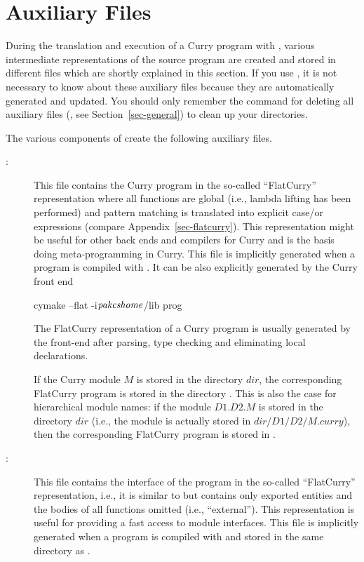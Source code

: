 \section{Auxiliary Files}
\label{sec-auxfiles}

During the translation and execution of a Curry program with \CYS,
various intermediate representations of the source program are created
and stored in different files which are shortly explained in this section.
If you use \CYS, it is not necessary to know about
these auxiliary files because they are automatically generated
and updated. You should only remember the command for deleting
all auxiliary files (, see Section~\ref{sec-general})
to clean up your directories.

The various components of \CYS create the following auxiliary files.
\begin{description}
\item[:] This file contains the Curry program
in the so-called ``FlatCurry'' representation where all functions are global
(i.e., lambda lifting has been performed) and pattern matching
is translated into explicit case/or expressions
(compare Appendix~\ref{sec-flatcurry}).
This representation might be useful for other back ends and
compilers for Curry and is the basis doing meta-programming in Curry.
This file is implicitly
generated when a program is compiled with \CYS.
It can be also explicitly generated by the Curry front end
\begin{curry}
cymake --flat -i$\mbox{\textit{pakcshome}}$/lib prog
\end{curry}
The FlatCurry representation of a Curry program is usually
generated by the front-end after parsing, type checking and eliminating
local declarations.

If the Curry module $M$ is stored in the directory $dir$,
the corresponding FlatCurry program is stored in the directory
.
This is also the case for hierarchical module names:
if the module $D1.D2.M$ is stored in the directory $dir$
(i.e., the module is actually stored in $dir/D1/D2/M.curry$),
then the corresponding FlatCurry program is stored in
.

\item[:] This file contains the interface
of the program in the so-called ``FlatCurry'' representation,
i.e., it is similar to  but contains only exported
entities and the bodies of all functions omitted (i.e., ``external'').
This representation is useful for providing a fast access
to module interfaces.
This file is implicitly generated when a program is compiled with \CYS
and stored in the same directory as .


\end{description}
